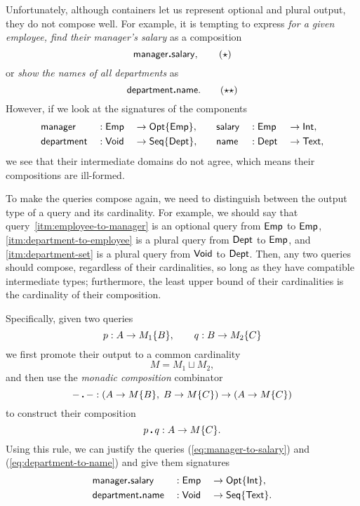 Unfortunately, although containers let us represent optional and plural output,
they do not compose well.  For example, it is tempting to express \emph{for a
given employee, find their manager's salary} as a composition
\begin{equation} \label{eq:manager-to-salary}
    \mathsf{manager}\boldsymbol{.}\mathsf{salary}, \tag{$\star$}
\end{equation}
or \emph{show the names of all departments} as
\begin{equation} \label{eq:department-to-name}
    \mathsf{department}\boldsymbol{.}\mathsf{name}. \tag{$\star\star$}
\end{equation}
However, if we look at the signatures of the components
\begin{alignat*}{6}
    & \mathsf{manager} && : \mathsf{Emp} && \to \mathsf{Opt}{\left\{\mathsf{Emp}\right\}}, \quad && \mathsf{salary} && : \mathsf{Emp} && \to \mathsf{Int}, \\
    & \mathsf{department} && : \mathsf{Void} && \to \mathsf{Seq}{\left\{\mathsf{Dept}\right\}}, \quad && \mathsf{name} && : \mathsf{Dept} && \to \mathsf{Text},
\end{alignat*}
we see that their intermediate domains do not agree, which means their
compositions are ill-formed.

To make the queries compose again, we need to distinguish between the output
type of a query and its cardinality.  For example, we should say that
query~\ref{itm:employee-to-manager} is an optional query from $\mathsf{Emp}$ to $\mathsf{Emp}$,
\ref{itm:department-to-employee} is a plural query from $\mathsf{Dept}$ to $\mathsf{Emp}$, and
\ref{itm:department-set} is a plural query from $\mathsf{Void}$ to $\mathsf{Dept}$.  Then, any
two queries should compose, regardless of their cardinalities, so long as they
have compatible intermediate types; furthermore, the least upper bound of their
cardinalities is the cardinality of their composition.

Specifically, given two queries
\begin{equation*}
    p : A \to M_1{\left\{B\right\}}, \qquad q : B \to M_2{\left\{C\right\}}
\end{equation*}
we first promote their output to a common cardinality
\begin{equation*}
    M = M_1 \sqcup M_2,
\end{equation*}
and then use the \emph{monadic composition} combinator
\begin{equation*}
    {-}\,\boldsymbol{.}\,{-} : (A \to M{\left\{B\right\}},\; B \to M{\left\{C\right\}}) \to (A \to M{\left\{C\right\}})
\end{equation*}
to construct their composition
\begin{equation*}
    p\,\boldsymbol{.}\,q : A \to M{\left\{C\right\}}.
\end{equation*}
Using this rule, we can justify the queries (\ref{eq:manager-to-salary}) and
(\ref{eq:department-to-name}) and give them signatures
\begin{alignat*}{3}
    & \mathsf{manager}\boldsymbol{.}\mathsf{salary} && : \mathsf{Emp} && \to \mathsf{Opt}{\left\{\mathsf{Int}\right\}}, \\
    & \mathsf{department}\boldsymbol{.}\mathsf{name} && : \mathsf{Void} && \to \mathsf{Seq}{\left\{\mathsf{Text}\right\}}.
\end{alignat*}

